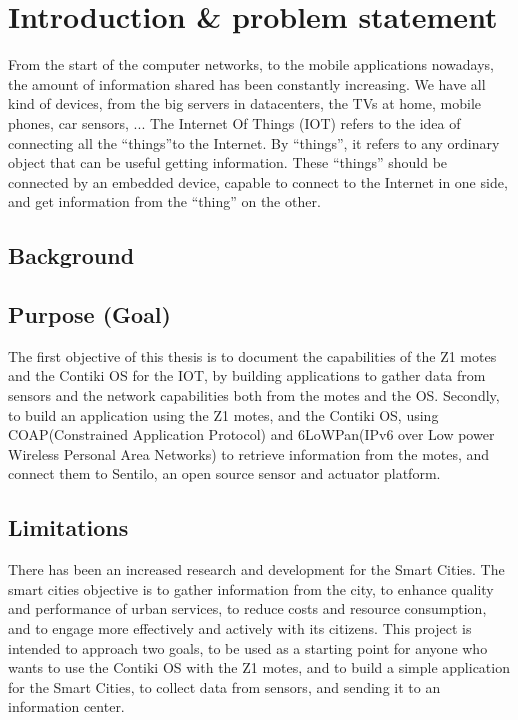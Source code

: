 \section{Introduction \& problem statement}

From the start of the computer networks,
	to the mobile applications nowadays,
	the amount of information shared has been constantly increasing.
We have all kind of devices,
	from the big servers in datacenters,
	the TVs at home,
	mobile phones,
	car sensors,
	...
The Internet Of Things (IOT) refers to the idea of connecting all the “things”to the Internet.
By “things”,
	it refers to any ordinary object that can be useful getting information.
These “things” should be connected by an embedded device,
	capable to connect to the Internet in one side,
	and get information from the “thing” on the other.

\subsection{Background}

\subsection{Purpose (Goal)}

The first objective of this thesis is to document the capabilities of the Z1 motes and the Contiki OS for the IOT,
	by building applications to gather data from sensors and the network capabilities both from the motes and the OS.
Secondly,
	to build an application using the Z1 motes,
	and the Contiki OS,
	using COAP(Constrained Application Protocol) and 6LoWPan(IPv6 over Low power Wireless Personal Area Networks) to retrieve information from the motes,
	and connect them to Sentilo,
	an open source sensor and actuator platform.

\subsection{Limitations}

There has been an increased research and development for the Smart Cities.
The smart cities objective is to gather information from the city,
	to enhance quality and performance of urban services,
	to reduce costs and resource consumption,
	and to engage more effectively and actively with its citizens.
This project is intended to approach two goals,
	to be used as a starting point for anyone who wants to use the Contiki OS with the Z1 motes,
	and to build a simple application for the Smart Cities,
	to collect data from sensors,
	and sending it to an information center.

